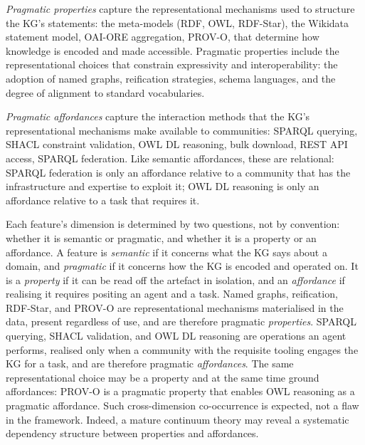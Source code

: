 \documentclass[runningheads]{llncs}
\newenvironment{onlyextended}{\ignorespaces}{\ignorespacesafterend}
\newenvironment{inboth}{}{}
\begin{document}
\begin{onlyextended}
\emph{Pragmatic properties} capture the representational mechanisms used to structure the KG's statements: the meta-models (RDF, OWL, RDF-Star), the Wikidata statement model, OAI-ORE aggregation, PROV-O, that determine how knowledge is encoded and made accessible. 
Pragmatic properties include the representational choices that constrain expressivity and interoperability: the adoption of named graphs, reification strategies, schema languages, and the degree of alignment to standard vocabularies.

\begin{sloppypar}\emph{Pragmatic affordances} capture the interaction methods that the KG's representational mechanisms make available to communities: SPARQL querying, SHACL constraint validation, OWL DL reasoning, bulk download, REST API access, SPARQL federation. 
Like semantic affordances, these are relational: SPARQL federation is only an affordance relative to a community that has the infrastructure and expertise to exploit it; OWL DL reasoning is only an affordance relative to a task that requires it.\end{sloppypar}
\end{onlyextended}

\begin{inboth}
Each feature's dimension is determined by two questions, not by convention: whether it is semantic or pragmatic, and whether it is a property or an affordance.
A feature is \emph{semantic} if it concerns what the KG says about a domain, and \emph{pragmatic} if it concerns how the KG is encoded and operated on.
It is a \emph{property} if it can be read off the artefact in isolation, and an \emph{affordance} if realising it requires positing an agent and a task.
Named graphs, reification, RDF-Star, and PROV-O are representational mechanisms materialised in the data, present regardless of use, and are therefore pragmatic \emph{properties}.
SPARQL querying, SHACL validation, and OWL DL reasoning are operations an agent performs, realised only when a community with the requisite tooling engages the KG for a task, and are therefore pragmatic \emph{affordances}.
The same representational choice may be a property and at the same time ground affordances: PROV-O is a pragmatic property that enables OWL reasoning as a pragmatic affordance.
Such cross-dimension co-occurrence is expected, not a flaw in the framework.
Indeed, a mature continuum theory may reveal a systematic dependency structure between properties and affordances.
\end{inboth}
\end{document}
